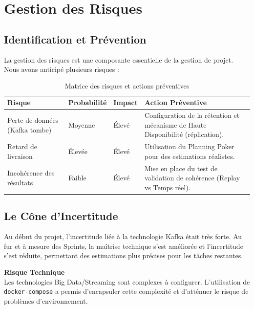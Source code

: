\chapter{Gestion des Risques}

\section{Identification et Prévention}

La gestion des risques est une composante essentielle de la gestion de projet. Nous avons anticipé plusieurs risques :

\begin{table}[H]
\centering
\begin{tabularx}{\textwidth}{L{4cm} C{2cm} C{2cm} X}
\toprule
\textbf{\color{primarycolor}Risque} &
\textbf{\color{primarycolor}Probabilité} &
\textbf{\color{primarycolor}Impact} &
\textbf{\color{primarycolor}Action Préventive} \\
\midrule
Perte de données (Kafka tombe) & Moyenne & Élevé & Configuration de la rétention et mécanisme de Haute Disponibilité (réplication). \\
\addlinespace[0.15cm]
Retard de livraison & Élevée & Élevé & Utilisation du Planning Poker pour des estimations réalistes. \\
\addlinespace[0.15cm]
Incohérence des résultats & Faible & Élevé & Mise en place du test de validation de cohérence (Replay vs Temps réel). \\
\bottomrule
\end{tabularx}
\caption{Matrice des risques et actions préventives}
\end{table}

\section{Le Cône d'Incertitude}

Au début du projet, l'incertitude liée à la technologie Kafka était très forte. Au fur et à mesure des Sprints, la maîtrise technique s'est améliorée et l'incertitude s'est réduite, permettant des estimations plus précises pour les tâches restantes.

\begin{warningbox}
    \textbf{\textcolor{red!70!black}{\large Risque Technique}}\\[0.3cm]
    Les technologies Big Data/Streaming sont complexes à configurer. L'utilisation de \texttt{docker-compose} a permis d'encapsuler cette complexité et d'atténuer le risque de problèmes d'environnement.
\end{warningbox}
